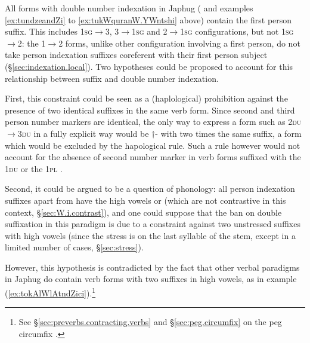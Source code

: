 

All forms with double number indexation in Japhug ( and examples \ref{ex:tundzeandZi} to \ref{ex:tukWquranW.YWntshi} above) contain the first person  suffix. This includes \textsc{1sg}$\rightarrow$3, 3$\rightarrow$\textsc{1sg} and 2$\rightarrow$\textsc{1sg} configurations, but not \textsc{1sg}$\rightarrow$2: the 1$\rightarrow$2 forms, unlike other configuration involving a first person, do not take person indexation suffixes coreferent with their first person subject (§\ref{sec:indexation.local}). Two hypotheses could be proposed to account for this relationship between  suffix and double number indexation.

First, this constraint could be seen as a (haplological) prohibition against the presence of two identical suffixes in the same verb form. Since second and third person number markers are identical, the only way to express a form such as \textsc{2du$\rightarrow$3du} in a fully explicit way would be $\dagger$\siga{}- with two times the same suffix, a form which would be excluded by the hapological rule. Such a rule however would not account for the absence of second number marker in verb forms suffixed with the \textsc{1du}  or the \textsc{1pl} .

Second, it could be argued to be a question of phonology: all person indexation suffixes apart from  have the high vowels  or  (which are not contrastive in this context, §\ref{sec:W.i.contrast}), and one could suppose that the ban on double suffixation in this paradigm is due to a constraint against two unstressed suffixes with high vowels (since the stress is on the last syllable of the stem, except in a limited number of cases, §\ref{sec:stress}).

However, this hypothesis is contradicted by the fact that other verbal paradigms in Japhug do contain verb forms with two suffixes in high vowels, as in example (\ref{ex:tokAlWlAtndZici}).\footnote{See §\ref{sec:preverbs.contracting.verbs} and §\ref{sec:peg.circumfix} on the peg  circumfix . }

